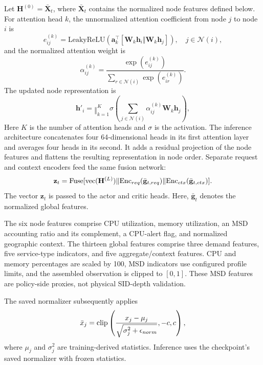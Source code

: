 \documentclass[final,5p]{elsarticle}
\newcommand{\rev}[1]{\textcolor{revisiongreen}{#1}}
\let\newrev\rev
\begin{document}
Let \rev{\(\mathbf{H}^{(0)}=\bar{\mathbf{X}}_t\), where \(\bar{\mathbf X}_t\) contains the normalized node features defined below.} For attention head \(k\), the unnormalized attention coefficient from node \(j\) to node \(i\) is
\begin{equation}
    e_{ij}^{(k)}
    =
    \mathrm{LeakyReLU}
    \left(
    \mathbf{a}_{k}^{\top}
    [\mathbf{W}_{k}\mathbf{h}_i \Vert \mathbf{W}_{k}\mathbf{h}_j]
    \right),
    \quad j\in\mathcal{N}(i),
\end{equation}
and the normalized attention weight is
\begin{equation}
    \alpha_{ij}^{(k)}
    =
    \frac{\exp(e_{ij}^{(k)})}
    {\sum_{r\in\mathcal{N}(i)}\exp(e_{ir}^{(k)})}.
\end{equation}
The updated node representation is
\begin{equation}
    \mathbf{h}'_i
    =
    \mathop{\Vert}_{k=1}^{K}
    \sigma
    \left(
    \sum_{j\in\mathcal{N}(i)}
    \alpha_{ij}^{(k)}\mathbf{W}_{k}\mathbf{h}_j
    \right),
\end{equation}
\newrev{Here \(K\) is the number of attention heads and \(\sigma\) is the activation. The inference architecture concatenates four 64-dimensional heads in its first attention layer and averages four heads in its second. It adds a residual projection of the node features and flattens the resulting representation in node order. Separate request and context encoders feed the same fusion network:}
\begin{equation}
\newrev{\mathbf{z}_t=\mathrm{Fuse}[\mathrm{vec}(\mathbf{H}^{(L)})\Vert\mathrm{Enc}_{req}(\bar{\mathbf g}_{t,req})\Vert\mathrm{Enc}_{ctx}(\bar{\mathbf g}_{t,ctx})].}
\end{equation}
The vector \(\mathbf{z}_t\) is passed to the actor and critic heads. \rev{Here, \(\bar{\mathbf g}_t\) denotes the normalized global features.}

\rev{The six node features comprise CPU utilization, memory utilization, an MSD accounting ratio and its complement, a CPU-alert flag, and normalized geographic context. The thirteen global features comprise three demand features, five service-type indicators, and five aggregate/context features. CPU and memory percentages are scaled by 100, MSD indicators use configured profile limits, and the assembled observation is clipped to \([0,1]\). These MSD features are policy-side proxies, not physical SID-depth validation.}

\rev{The saved normalizer subsequently applies}
\begin{equation}
\rev{\bar{x}_j=\mathrm{clip}\left(\frac{x_j-\mu_j}{\sqrt{\sigma_j^2+\epsilon_{norm}}},-c,c\right),}\label{eq:feature_normalization}
\end{equation}
\rev{where \(\mu_j\) and \(\sigma_j^2\) are training-derived statistics. \rev{Inference uses the checkpoint's saved normalizer with frozen statistics.}}
\end{document}
